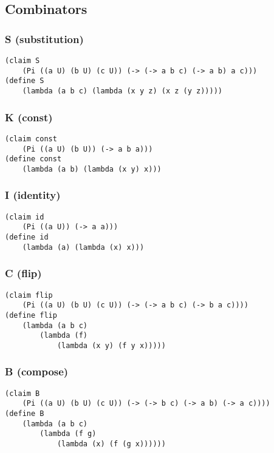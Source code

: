 \subsection{Combinators}

\subsubsection{S (substitution)} \label{code:S}
\begin{verbatim}
(claim S
    (Pi ((a U) (b U) (c U)) (-> (-> a b c) (-> a b) a c)))
(define S
    (lambda (a b c) (lambda (x y z) (x z (y z)))))
\end{verbatim}

\subsubsection{K (const)} \label{code:K}
\begin{verbatim}
(claim const
    (Pi ((a U) (b U)) (-> a b a)))
(define const
    (lambda (a b) (lambda (x y) x)))
\end{verbatim}

\subsubsection{I (identity)} \label{code:I}
\begin{verbatim}
(claim id 
    (Pi ((a U)) (-> a a)))
(define id
    (lambda (a) (lambda (x) x)))
\end{verbatim}

\subsubsection{C (flip)} \label{code:C}
\begin{verbatim}
(claim flip
    (Pi ((a U) (b U) (c U)) (-> (-> a b c) (-> b a c))))
(define flip
    (lambda (a b c)
        (lambda (f)
            (lambda (x y) (f y x)))))
\end{verbatim}

\subsubsection{B (compose)} \label{code:B}
\begin{verbatim}
(claim B
    (Pi ((a U) (b U) (c U)) (-> (-> b c) (-> a b) (-> a c))))
(define B
    (lambda (a b c)
        (lambda (f g)
            (lambda (x) (f (g x))))))
\end{verbatim}

